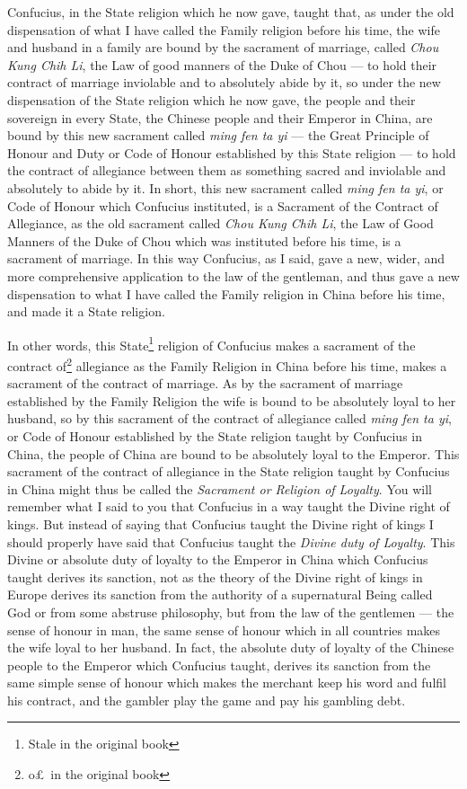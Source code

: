 Confucius, in the State religion which he now gave, taught that, as under the old dispensation of what I have called the Family religion before his time, the wife and husband in a family are bound by the sacrament of marriage, called \emph{Chou Kung Chih Li}, the Law of good manners of the Duke of Chou --- to hold their contract of marriage inviolable and to absolutely abide by it, so under the new dispensation of the State religion which he now gave, the people and their sovereign in every State, the Chinese people and their Emperor in China, are bound by this new sacrament called {\em{ming fen ta yi}} --- the Great Principle of Honour and Duty or Code of Honour established by this State religion --- to hold the contract of allegiance between them as something sacred and inviolable and absolutely to abide by it.
In short, this new sacrament called {\em{ming fen ta yi}}, or Code of Honour which Confucius instituted, is a Sacrament of the Contract of Allegiance, as the old sacrament called \emph{Chou Kung Chih Li}, the Law of Good Manners of the Duke of Chou which was instituted before his time, is a sacrament of marriage.
In this way Confucius, as I said, gave a new, wider, and more comprehensive application to the law of the gentleman, and thus gave a new dispensation to what I have called the Family religion in China before his time, and made it a State religion.

In other words, this State\footnote{Stale in the original book} religion of Confucius makes a sacrament of the contract of\footnote{o\pounds\, in the original book} allegiance as the Family Religion in China before his time, makes a sacrament of the contract of marriage. 
As by the sacrament of marriage established by the Family Religion the wife is bound to be absolutely loyal to her husband, so by this sacrament of the contract of allegiance called {\em{ming fen ta yi}}, or Code of Honour established by the State religion taught by Confucius in China, the people of China are bound to be absolutely loyal to the Emperor. 
This sacrament of the contract of allegiance in the State religion taught by Confucius in China might thus be called the \emph{Sacrament or Religion of Loyalty}. 
You will remember what I said to you that Confucius in a way taught the Divine right of kings. 
But instead of saying that Confucius taught the Divine right of kings I should properly have  said that Confucius taught the \emph{Divine duty of Loyalty}.
This Divine or absolute duty of loyalty to the Emperor in China which Confucius taught derives its sanction, not as the theory of the Divine right of kings in Europe derives its sanction from the authority of a supernatural Being called God or from some abstruse philosophy, but from the law of the gentlemen --- the sense of honour in man, the same sense of honour which in all countries makes the wife loyal to her husband.
In fact, the absolute duty of loyalty of the Chinese people to the Emperor which Confucius taught, derives its sanction from the same simple sense of honour which makes the merchant keep his word and fulfil his contract, and the gambler play the game and pay his gambling debt.

